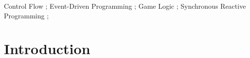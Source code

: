 \documentclass[10pt, conference, compsocconf]{IEEEtran}
\newcommand{\CEU}{\textsc{C\'{e}u}\xspace}
\begin{document}

\maketitle

\begin{abstract}
We present a qualitative case study of rewriting the video game Pingus from C++
to the structured synchronous reactive language \CEU.
%
\CEU supports reactive control-flow primitives that eliminate callbacks and let
programmers write code in direct and sequential style.
Structured reactivity helps describing complex control-flow relationships in
the game logic more concisely.
%
We show gains in productivity for four behaviors in Pingus through a
qualitative analysis of the proposed implementations in \CEU in comparison to
the originals in C++.
%
We also categorize the behaviors in recurrent control-flow patterns that likely
apply to most games.
\end{abstract}

\begin{IEEEkeywords}
Control Flow                     ;
Event-Driven Programming         ;
Game Logic                       ;
Synchronous Reactive Programming ;
\end{IEEEkeywords}



\section{Introduction}
\end{document}
